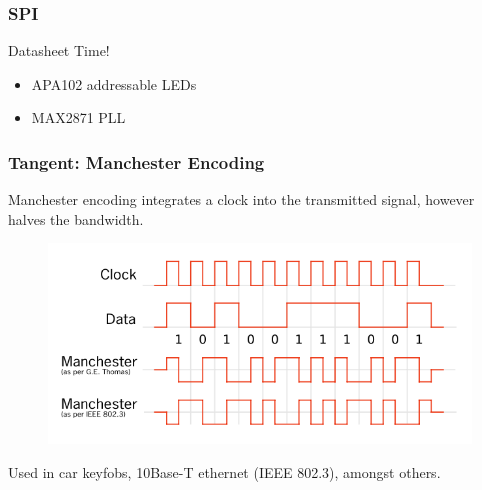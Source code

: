 \documentclass[t]{beamer}
\begin{document}
\begin{frame}[t]
\frametitle{SPI}
Datasheet Time!
\begin{itemize}
	\item APA102 addressable LEDs
	\item MAX2871 PLL 
\end{itemize}

\end{frame}


\begin{frame}[t]
\frametitle{Tangent: Manchester Encoding}
Manchester encoding integrates a clock into the transmitted signal, however halves the bandwidth. \\
\begin{figure}
	\includegraphics[width=0.9\linewidth]{manchester.png}
\end{figure}
Used in car keyfobs, 10Base-T ethernet (IEEE 802.3), amongst others. 
\end{frame}

\end{document}
